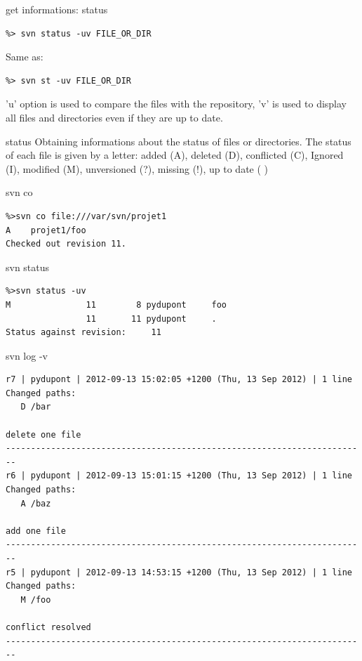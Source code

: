 \documentclass[12pt]{beamer}
\begin{document}
\begin{frame}[fragile]
	\begin{block}{get informations: status}
		\begin{verbatim}
%> svn status -uv FILE_OR_DIR
		\end{verbatim}
		Same as:
		\begin{verbatim}
%> svn st -uv FILE_OR_DIR
		\end{verbatim}
'u' option is used to compare the files with the repository, 'v' is used to display all files and directories even if they are up to date.
	\end{block}
	\begin{exampleblock}{status}
		 Obtaining informations about the status of files or directories. The status of each file is given by a letter: added (A), deleted (D), conflicted (C), Ignored (I), modified (M), unversioned (?), missing (!), up to date ( )
	\end{exampleblock}
\end{frame}


\begin{frame}[fragile]
	\begin{block}{svn co}
		\begin{verbatim}
%>svn co file:///var/svn/projet1
A    projet1/foo
Checked out revision 11.
		\end{verbatim}
	\end{block}
	\begin{block}{svn status}
		\begin{verbatim}
%>svn status -uv
M               11        8 pydupont     foo
                11       11 pydupont     .
Status against revision:     11
		\end{verbatim}
	\end{block}
\end{frame}

\begin{frame}[fragile]
	\begin{block}{svn log -v}
		\begin{verbatim}
r7 | pydupont | 2012-09-13 15:02:05 +1200 (Thu, 13 Sep 2012) | 1 line
Changed paths:
   D /bar

delete one file
------------------------------------------------------------------------
r6 | pydupont | 2012-09-13 15:01:15 +1200 (Thu, 13 Sep 2012) | 1 line
Changed paths:
   A /baz

add one file
------------------------------------------------------------------------
r5 | pydupont | 2012-09-13 14:53:15 +1200 (Thu, 13 Sep 2012) | 1 line
Changed paths:
   M /foo

conflict resolved
------------------------------------------------------------------------
		\end{verbatim}
	\end{block}
\end{frame}
\end{document}

